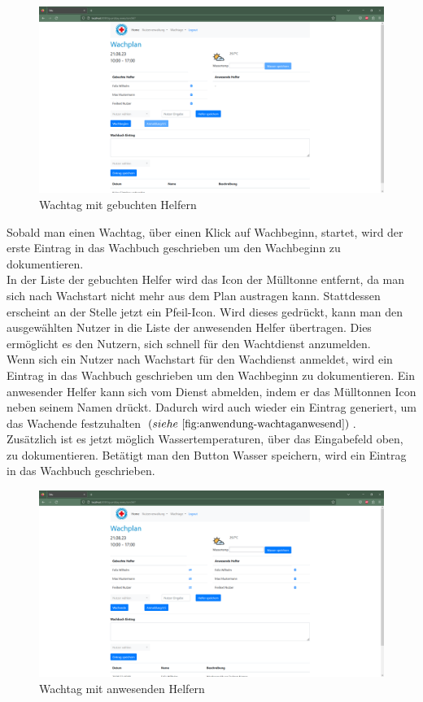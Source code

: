 \documentclass[fontsize=12pt,openright,oneside,paper=a4,BCOR=1cm]{scrbook}
\begin{document}
\begin{figure}[H]
  \centering
    \includegraphics[width=0.7\linewidth]{Anlagen/Anwendung/8-1WachtagNutzerGebucht.png}
    \caption{Wachtag mit gebuchten Helfern}
  \label{fig:anwendung-wachtaggebucht}
\end{figure}

Sobald man einen Wachtag, \"uber einen Klick auf \glqq Wachbeginn\grqq{}, startet, wird der erste Eintrag in das Wachbuch geschrieben um den Wachbeginn zu dokumentieren. \\
In der Liste der gebuchten Helfer wird das Icon der M\"ulltonne entfernt, da man sich nach Wachstart nicht mehr aus dem Plan austragen kann. Stattdessen erscheint an der Stelle jetzt ein Pfeil-Icon. Wird dieses gedr\"uckt, kann man den ausgew\"ahlten Nutzer in die Liste der anwesenden Helfer \"ubertragen. Dies erm\"oglicht es den Nutzern, sich schnell f\"ur den Wachtdienst anzumelden. \\
Wenn sich ein Nutzer nach Wachstart f\"ur den Wachdienst anmeldet, wird ein Eintrag in das Wachbuch geschrieben um den Wachbeginn zu dokumentieren. Ein anwesender Helfer kann sich vom Dienst abmelden, indem er das M\"ulltonnen Icon neben seinem Namen dr\"uckt. Dadurch wird auch wieder ein Eintrag generiert, um das Wachende festzuhalten $(siehe~\ref{fig:anwendung-wachtaganwesend})$. \\
Zus\"atzlich ist es jetzt m\"oglich Wassertemperaturen, \"uber das Eingabefeld oben, zu dokumentieren. Bet\"atigt man den Button \glqq Wasser speichern\grqq{}, wird ein Eintrag in das Wachbuch geschrieben. \\

\begin{figure}[H]
  \centering
    \includegraphics[width=0.7\linewidth]{Anlagen/Anwendung/8-3WachtagAnwesendeNutzer.png}
    \caption{Wachtag mit anwesenden Helfern}
  \label{fig:anwendung-wachtaganwesend}
\end{figure}
\end{document}
